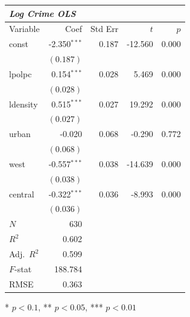 \documentclass{article}
\begin{document}
\renewcommand{\arraystretch}{1.1}
\setlength{\tabcolsep}{6pt}
\begin{tabular}{lrrrr}
\hline
\multicolumn{5}{l}{\textit{Log Crime OLS}} \\
\hline
Variable & Coef & Std Err & $t$ & $p$ \\
\hline
const & -2.350$^{\ast\ast\ast}$ & 0.187 & -12.560 & 0.000 \\
 & $(0.187)$ & & & \\
lpolpc & 0.154$^{\ast\ast\ast}$ & 0.028 & 5.469 & 0.000 \\
 & $(0.028)$ & & & \\
ldensity & 0.515$^{\ast\ast\ast}$ & 0.027 & 19.292 & 0.000 \\
 & $(0.027)$ & & & \\
urban & -0.020 & 0.068 & -0.290 & 0.772 \\
 & $(0.068)$ & & & \\
west & -0.557$^{\ast\ast\ast}$ & 0.038 & -14.639 & 0.000 \\
 & $(0.038)$ & & & \\
central & -0.322$^{\ast\ast\ast}$ & 0.036 & -8.993 & 0.000 \\
 & $(0.036)$ & & & \\
\hline
$N$ & 630 & & & \\
$R^2$ & 0.602 & & & \\
Adj.\ $R^2$ & 0.599 & & & \\
$F$-stat & 188.784 & & & \\
RMSE & 0.363 & & & \\
\hline
\end{tabular}
\vspace{2pt}
\begin{flushleft}\footnotesize{* $p<0.1$, ** $p<0.05$, *** $p<0.01$}\end{flushleft}
\end{document}
